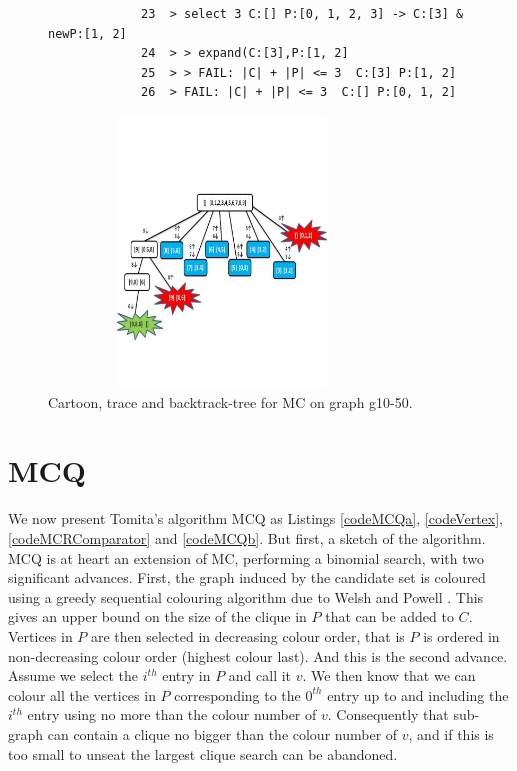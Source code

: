 \documentclass{l4proj}
\begin{document}
\begin{figure}
\begin{scriptsize}
\begin{verbatim}
             23  > select 3 C:[] P:[0, 1, 2, 3] -> C:[3] & newP:[1, 2]
             24  > > expand(C:[3],P:[1, 2]
             25  > > FAIL: |C| + |P| <= 3  C:[3] P:[1, 2]
             26  > FAIL: |C| + |P| <= 3  C:[] P:[0, 1, 2]
\end{verbatim}
\end{scriptsize}
\vspace{-3mm}
%
\centering
\includegraphics[height=7.2cm,width=9.2cm]{mcTree.pdf}
\vspace{-15mm}
\caption{Cartoon, trace and backtrack-tree for MC on graph g10-50.}
\label{traceMC}
\end{figure}


%
\section{MCQ}
\label{sec:mcqCode}
We now present Tomita's algorithm MCQ \cite{tomita2003} as Listings \ref{codeMCQa}, \ref{codeVertex}, \ref{codeMCRComparator} and \ref{codeMCQb}.
But first, a sketch of the algorithm.
MCQ is at heart an extension of MC, performing a binomial search, with two significant advances. First, the graph induced by the candidate set
is coloured using a greedy sequential colouring algorithm due to Welsh and Powell \cite{welshPowell}. This gives an upper bound
on the size of the clique in $P$ that can be added to $C$. Vertices in $P$ are then selected in decreasing colour order, that is $P$ is ordered
in non-decreasing colour order (highest colour last). And this is the second advance. Assume we select the $i^{th}$ entry in $P$ and call it $v$. 
We then know that we can colour
all the vertices in $P$ corresponding to the $0^{th}$ entry up to and including the $i^{th}$ entry using no more than the colour number
of $v$. Consequently that sub-graph can contain a clique no bigger than the colour number of $v$, and if this is too small to unseat the largest clique
search can be abandoned.
\end{document}

